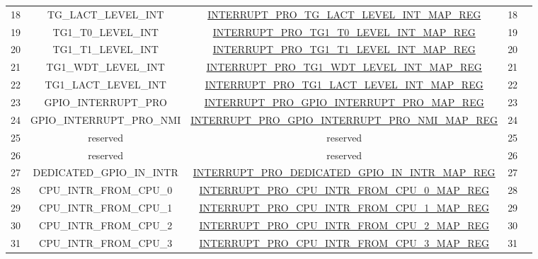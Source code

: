 \begin{footnotesize}
\begin{longtable}[c]{|*{5}{c|}}
    \cline{1-4}
    18 & TG\_LACT\_LEVEL\_INT &\hyperref[regdesc:INTERRUPTPROTGLACTLEVELINTMAPREG]{INTERRUPT\_PRO\_TG\_LACT\_LEVEL\_INT\_MAP\_REG} &18 &                          	\\
    \cline{1-4}
    19 & TG1\_T0\_LEVEL\_INT &\hyperref[regdesc:INTERRUPTPROTG1T0LEVELINTMAPREG]{INTERRUPT\_PRO\_TG1\_T0\_LEVEL\_INT\_MAP\_REG} &19 &                          	\\
    \cline{1-4}
    20 & TG1\_T1\_LEVEL\_INT &\hyperref[regdesc:INTERRUPTPROTG1T1LEVELINTMAPREG]{INTERRUPT\_PRO\_TG1\_T1\_LEVEL\_INT\_MAP\_REG} &20 &                          	\\
    \cline{1-4}
    21 & TG1\_WDT\_LEVEL\_INT &\hyperref[regdesc:INTERRUPTPROTG1WDTLEVELINTMAPREG]{INTERRUPT\_PRO\_TG1\_WDT\_LEVEL\_INT\_MAP\_REG} &21 &                          	\\
    \cline{1-4}
    22 & TG1\_LACT\_LEVEL\_INT &\hyperref[regdesc:INTERRUPTPROTG1LACTLEVELINTMAPREG]{INTERRUPT\_PRO\_TG1\_LACT\_LEVEL\_INT\_MAP\_REG} &22 &                          	\\
    \cline{1-4}
    23 & GPIO\_INTERRUPT\_PRO &\hyperref[regdesc:INTERRUPTPROGPIOINTERRUPTPROMAPREG]{INTERRUPT\_PRO\_GPIO\_INTERRUPT\_PRO\_MAP\_REG} &23 &                          	\\
    \cline{1-4}
    24 & GPIO\_INTERRUPT\_PRO\_NMI &\hyperref[regdesc:INTERRUPTPROGPIOINTERRUPTPRONMIMAPREG]{INTERRUPT\_PRO\_GPIO\_INTERRUPT\_PRO\_NMI\_MAP\_REG} &24 &                          	\\
    \cline{1-4}
    25 & reserved &reserved &25 &                          	\\
    \cline{1-4}
    26 & reserved &reserved &26 &                          	\\
    \cline{1-4}
    27 & DEDICATED\_GPIO\_IN\_INTR &\hyperref[regdesc:INTERRUPTPRODEDICATEDGPIOININTRMAPREG]{INTERRUPT\_PRO\_DEDICATED\_GPIO\_IN\_INTR\_MAP\_REG} &27 &                          	\\
    \cline{1-4}
    28 & CPU\_INTR\_FROM\_CPU\_0 &\hyperref[regdesc:INTERRUPTPROCPUINTRFROMCPU0MAPREG]{INTERRUPT\_PRO\_CPU\_INTR\_FROM\_CPU\_0\_MAP\_REG} &28 &                          	\\
    \cline{1-4}
    29 & CPU\_INTR\_FROM\_CPU\_1 &\hyperref[regdesc:INTERRUPTPROCPUINTRFROMCPU1MAPREG]{INTERRUPT\_PRO\_CPU\_INTR\_FROM\_CPU\_1\_MAP\_REG} &29 &                          	\\
    \cline{1-4}
    30 & CPU\_INTR\_FROM\_CPU\_2 &\hyperref[regdesc:INTERRUPTPROCPUINTRFROMCPU2MAPREG]{INTERRUPT\_PRO\_CPU\_INTR\_FROM\_CPU\_2\_MAP\_REG} &30 &                          	\\
    \cline{1-4}
    31 & CPU\_INTR\_FROM\_CPU\_3 &\hyperref[regdesc:INTERRUPTPROCPUINTRFROMCPU3MAPREG]{INTERRUPT\_PRO\_CPU\_INTR\_FROM\_CPU\_3\_MAP\_REG} &31 &                          	\\
    \hline
    

\end{longtable}
\end{footnotesize}
